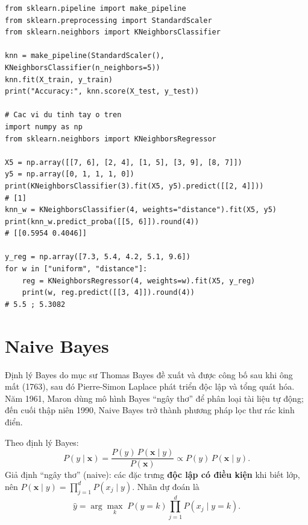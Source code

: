 \begin{lstlisting}[caption={KNN với scikit-learn}]
from sklearn.pipeline import make_pipeline
from sklearn.preprocessing import StandardScaler
from sklearn.neighbors import KNeighborsClassifier

knn = make_pipeline(StandardScaler(), KNeighborsClassifier(n_neighbors=5))
knn.fit(X_train, y_train)
print("Accuracy:", knn.score(X_test, y_test))

# Cac vi du tinh tay o tren
import numpy as np
from sklearn.neighbors import KNeighborsRegressor

X5 = np.array([[7, 6], [2, 4], [1, 5], [3, 9], [8, 7]])
y5 = np.array([0, 1, 1, 1, 0])
print(KNeighborsClassifier(3).fit(X5, y5).predict([[2, 4]]))          # [1]
knn_w = KNeighborsClassifier(4, weights="distance").fit(X5, y5)
print(knn_w.predict_proba([[5, 6]]).round(4))                         # [[0.5954 0.4046]]

y_reg = np.array([7.3, 5.4, 4.2, 5.1, 9.6])
for w in ["uniform", "distance"]:
    reg = KNeighborsRegressor(4, weights=w).fit(X5, y_reg)
    print(w, reg.predict([[3, 4]]).round(4))                          # 5.5 ; 5.3082
\end{lstlisting}

\section{Naive Bayes}

Định lý Bayes do mục sư Thomas Bayes đề xuất và được công bố sau khi ông mất (1763), sau đó Pierre-Simon Laplace phát triển độc lập và tổng quát hóa. Năm 1961, Maron dùng mô hình Bayes ``ngây thơ'' để phân loại tài liệu tự động; đến cuối thập niên 1990, Naive Bayes trở thành phương pháp lọc thư rác kinh điển.

\begin{definition}
Theo định lý Bayes:
\begin{equation}
    P(y \mid \mathbf{x}) = \frac{P(y)\, P(\mathbf{x} \mid y)}{P(\mathbf{x})} \propto P(y)\, P(\mathbf{x} \mid y).
\end{equation}
Giả định ``ngây thơ'' (naive): các đặc trưng \textbf{độc lập có điều kiện} khi biết lớp, nên $P(\mathbf{x} \mid y) = \prod_{j=1}^{d} P(x_j \mid y)$. Nhãn dự đoán là
\begin{equation}
    \hat{y} = \arg\max_{k} \; P(y = k) \prod_{j=1}^{d} P(x_j \mid y = k).
\end{equation}
\end{definition}

